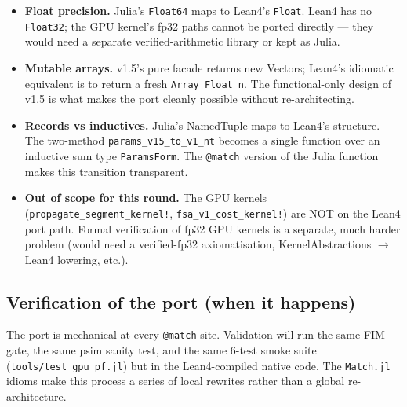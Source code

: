 \documentclass[11pt,a4paper]{article}
\begin{document}
\begin{itemize}[itemsep=2pt,leftmargin=*]
\item \textbf{Float precision.} Julia's \texttt{Float64} maps to
  Lean4's \texttt{Float}. Lean4 has no \texttt{Float32}; the GPU
  kernel's fp32 paths cannot be ported directly --- they would
  need a separate verified-arithmetic library or kept as Julia.

\item \textbf{Mutable arrays.} v1.5's pure facade returns new
  Vectors; Lean4's idiomatic equivalent is to return a fresh
  \texttt{Array Float n}. The functional-only design of v1.5 is
  what makes the port cleanly possible without re-architecting.

\item \textbf{Records vs inductives.} Julia's NamedTuple maps to
  Lean4's structure. The two-method \texttt{params\_v15\_to\_v1\_nt}
  becomes a single function over an inductive sum type
  \texttt{ParamsForm}. The \texttt{@match} version of the Julia
  function makes this transition transparent.

\item \textbf{Out of scope for this round.} The GPU kernels
  (\texttt{propagate\_segment\_kernel!},
  \texttt{fsa\_v1\_cost\_kernel!}) are NOT on the Lean4 port path.
  Formal verification of fp32 GPU kernels is a separate, much
  harder problem (would need a verified-fp32 axiomatisation,
  KernelAbstractions $\to$ Lean4 lowering, etc.).
\end{itemize}

\subsection{Verification of the port (when it happens)}

The port is mechanical at every \texttt{@match} site. Validation will
run the same FIM gate, the same psim sanity test, and the same
6-test smoke suite (\texttt{tools/test\_gpu\_pf.jl}) but in the
Lean4-compiled native code. The \texttt{Match.jl} idioms make this
process a series of local rewrites rather than a global
re-architecture.
\end{document}
